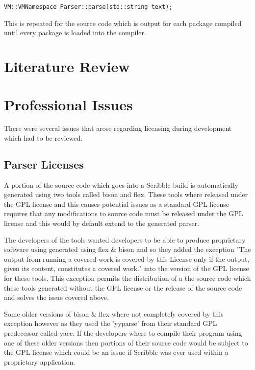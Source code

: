 \documentclass[]{final_report}
\begin{document}
\begin{verbatim}
VM::VMNamespace Parser::parse(std::string text);
\end{verbatim}

This is repeated for the source code which is output for each package compiled until every package is loaded into the compiler.

\chapter{Literature Review}

\chapter{Professional Issues}

There were several issues that arose regarding licensing during development which had to be reviewed.

\section{Parser Licenses}

A portion of the source code which goes into a Scribble build is automatically generated using two tools called bison and flex. These tools where released under the GPL license and this causes potential issues as a standard GPL license requires that any modifications to source code must be released under the GPL license and this would by default extend to the generated parser.

The developers of the tools wanted developers to be able to produce proprietary software using generated using flex \& bison and so they added the exception "The output from running a covered work is covered by this License only if the output, given its content, constitutes a covered work." into the version of the GPL license for these tools. This exception permits the distribution of a the source code which these tools generated without the GPL license or the release of the source code and solves the issue covered above.

Some older versions of bison \& flex where not completely covered by this exception however as they used the 'yyparse' from their standard GPL predecessor called yacc. If the developers where to compile their program using one of these older versions then portions of their source code would be subject to the GPL license which could be an issue if Scribble was ever used within a proprietary application.
\end{document}

